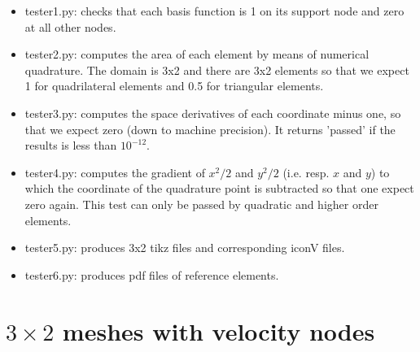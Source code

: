 \begin{itemize}
\item {\pythonfile tester1.py}: checks that each basis function is 1 on its support node and zero at all other nodes.
\item {\pythonfile tester2.py}: computes the area of each element by means of numerical quadrature. The domain is 3x2 and there are 3x2 elements so that we expect 1 for quadrilateral elements and 0.5 for triangular elements.  
\item {\pythonfile tester3.py}: computes the space derivatives of each coordinate minus one, so that we expect zero (down to machine precision). It returns 'passed' if the results is less than $10^{-12}$.   
\item {\pythonfile tester4.py}: computes the gradient of $x^2/2$ and $y^2/2$ (i.e. resp. $x$ and $y$) to which the coordinate of the quadrature point is subtracted so that one expect zero again. This test can only be passed by quadratic and higher order elements.
\item {\pythonfile tester5.py}: produces 3x2 tikz files and corresponding iconV files. 
\item {\pythonfile tester6.py}: produces pdf files of reference elements.
\end{itemize}


\newpage
\section*{$3\times 2$ meshes with velocity nodes}

\begin{multicols}{2}


\begin{tiny}

\end{tiny}
\end{multicols}

\begin{multicols}{2}


\begin{tiny}

\end{tiny}
\end{multicols}

